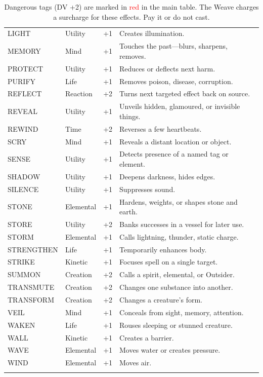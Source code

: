 \begin{longtable}{p{} p{} p{} p{}}
LIGHT & Utility & +1 & Creates illumination. \\
MEMORY & Mind & +1 & Touches the past---blurs, sharpens, removes. \\
PROTECT & Utility & +1 & Reduces or deflects next harm. \\
PURIFY & Life & +1 & Removes poison, disease, corruption. \\
REFLECT & Reaction & +2 & Turns next targeted effect back on source. \\
REVEAL & Utility & +1 & Unveils hidden, glamoured, or invisible things. \\
REWIND & Time & +2 & Reverses a few heartbeats. \\
SCRY & Mind & +1 & Reveals a distant location or object. \\
SENSE & Utility & +1 & Detects presence of a named tag or element. \\
SHADOW & Utility & +1 & Deepens darkness, hides edges. \\
SILENCE & Utility & +1 & Suppresses sound. \\
STONE & Elemental & +1 & Hardens, weights, or shapes stone and earth. \\
STORE & Utility & +2 & Banks successes in a vessel for later use. \\
STORM & Elemental & +1 & Calls lightning, thunder, static charge. \\
STRENGTHEN & Life & +1 & Temporarily enhances body. \\
STRIKE & Kinetic & +1 & Focuses spell on a single target. \\
SUMMON & Creation & +2 & Calls a spirit, elemental, or Outsider. \\
TRANSMUTE & Creation & +2 & Changes one substance into another. \\
TRANSFORM & Creation & +2 & Changes a creature's form. \\
VEIL & Mind & +1 & Conceals from sight, memory, attention. \\
WAKEN & Life & +1 & Rouses sleeping or stunned creature. \\
WALL & Kinetic & +1 & Creates a barrier. \\
WAVE & Elemental & +1 & Moves water or creates pressure. \\
WIND & Elemental & +1 & Moves air. \\
\hline
\caption*{Dangerous tags (DV +2) are marked in \textcolor{red}{red} in the main table. The Weave charges a surcharge for these effects. Pay it or do not cast.}
\end{longtable}

